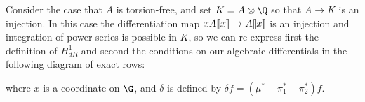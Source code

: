 \begin{example}
Consider the case that \(A\) is torsion-free, and set \(K = A \otimes \Q\) so that \(A \to K\) is an injection.  In this case the differentiation map \(x A\llbracket{x}\rrbracket \to A\llbracket{x}\rrbracket\) is an injection and integration of power series is possible in \(K\), so we can re-express first the definition of \(H^1_{dR}\) and second the conditions on our algebraic differentials in the following diagram of exact rows:
\begin{center}
\end{center}
where \(x\) is a coordinate on \(\G\), and \(\delta\) is defined by \(\delta f = (\mu^* - \pi_1^* - \pi_2^*)f\).
\end{example}


